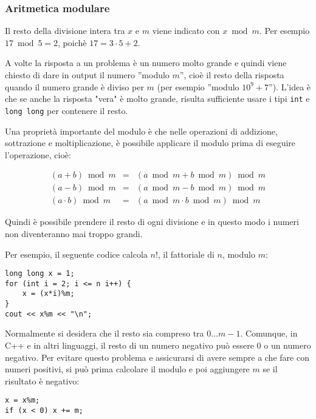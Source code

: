 \subsubsection{Aritmetica modulare}


Il resto della divisione intera tra $x$ e $m$
viene indicato con $x \bmod m$.
Per esempio $17 \bmod 5 = 2$,
poichè $17 = 3 \cdot 5 + 2$.

A volte la risposta a un problema è un numero molto 
grande e quindi viene chiesto di dare in output
il numero ''modulo $m$'', cioè il resto
della risposta quando il numero grande è diviso per $m$
(per esempio ''modulo $10^9+7$'').
L'idea è che se anche la risposta "vera" è molto grande,
risulta sufficiente usare i tipi \texttt{int} e \texttt{long long}
per contenere il resto.

Una proprietà importante del modulo è che
nelle operazioni di addizione,
sottrazione e moltiplicazione, è possibile applicare il modulo
prima di eseguire l'operazione, cioè:

\[
\begin{array}{rcr}
(a+b) \bmod m & = & (a \bmod m + b \bmod m) \bmod m \\
(a-b) \bmod m & = & (a \bmod m - b \bmod m) \bmod m \\
(a \cdot b) \bmod m & = & (a \bmod m \cdot b \bmod m) \bmod m
\end{array}
\]

Quindi è possibile prendere il resto di ogni divisione
e in questo modo i numeri non diventeranno mai troppo grandi.

Per esempio, il seguente codice calcola $n!$,
il fattoriale di $n$, modulo $m$:

\begin{lstlisting}
long long x = 1;
for (int i = 2; i <= n i++) {
    x = (x*i)%m;
}
cout << x%m << "\n";
\end{lstlisting}

Normalmente si desidera che il resto sia
compreso tra $0\ldots m-1$.
Comunque, in C++ e in altri linguaggi,
il resto di un numero negativo può essere 0 
o un numero negativo. Per evitare questo problema
e assicurarsi di avere sempre a che fare con numeri 
positivi, si può prima calcolare il modulo e poi
aggiungere $m$ se il risultato è negativo:

\begin{lstlisting}
x = x%m;
if (x < 0) x += m;
\end{lstlisting}


